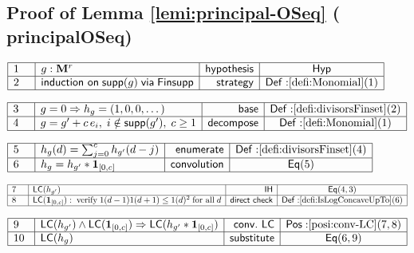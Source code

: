 \documentclass[11pt,reqno]{amsart}
\begin{document}
\medskip


\subsection*{Proof of Lemma \protect\ref{lemi:principal-OSeq} (\textsf{%
principalOSeq})}

\noindent$%
\begin{array}{|m{0.5cm}|l|r|c|}
\hline
1 & g:\mathbf{M}^{r} & \mathsf{hypothesis} & \mathsf{Hyp} \\ \hline
2 & \mathsf{induction\ on}\;\mathsf{supp}(g)\;\mathsf{via}\;\mathsf{Finsupp}
& \mathsf{strategy} & \mathsf{Def:}\ref{defi:Monomial}(1) \\ \hline
\end{array}%
$

\nointerlineskip\noindent$%
\begin{array}{|m{0.5cm}|l|r|c|}
\hline
3 & g=0\Rightarrow h_{g}=(1,0,0,\dots) & \mathsf{base} & \mathsf{Def:}\ref%
{defi:divisorsFinset}(2) \\ \hline
4 & g=g^{\prime}+c\,e_{i},\;i\notin\mathsf{supp}(g^{\prime}),\;c\ge1 & 
\mathsf{decompose} & \mathsf{Def:}\ref{defi:Monomial}(1) \\ \hline
\end{array}%
$

\nointerlineskip\noindent$%
\begin{array}{|m{0.5cm}|l|r|c|}
\hline
5 & h_{g}(d)=\sum_{j=0}^{c}h_{g^{\prime}}(d-j) & \mathsf{enumerate} & 
\mathsf{Def:}\ref{defi:divisorsFinset}(4) \\ \hline
6 & h_{g}=h_{g^{\prime}}*\mathbf{1}_{[0,c]} & \mathsf{convolution} & \mathsf{%
Eq}(5) \\ \hline
\end{array}%
$

\nointerlineskip\noindent$%
\begin{array}{|m{0.5cm}|l|r|c|}
\hline
7 & \mathsf{LC}(h_{g^{\prime}}) & \mathsf{IH} & \mathsf{Eq}(4,3) \\ \hline
8 & \mathsf{LC}(\mathbf{1}_{[0,c]}):\;\text{verify}\;1(d-1)1(d+1)\le
1(d)^{2}\;\text{for all}\;d & \mathsf{direct\ check} & \mathsf{Def:}\ref%
{defi:IsLogConcaveUpTo}(6) \\ \hline
\end{array}%
$

\nointerlineskip\noindent$%
\begin{array}{|m{0.5cm}|l|r|c|}
\hline
9 & \mathsf{LC}(h_{g^{\prime}})\wedge\mathsf{LC}(\mathbf{1}%
_{[0,c]})\Rightarrow\mathsf{LC}(h_{g^{\prime}}*\mathbf{1}_{[0,c]}) & \mathsf{%
conv.\ LC} & \mathsf{Pos:}\ref{posi:conv-LC}(7,8) \\ \hline
10 & \mathsf{LC}(h_{g}) & \mathsf{substitute} & \mathsf{Eq}(6,9) \\ \hline
\end{array}%
$
\end{document}
